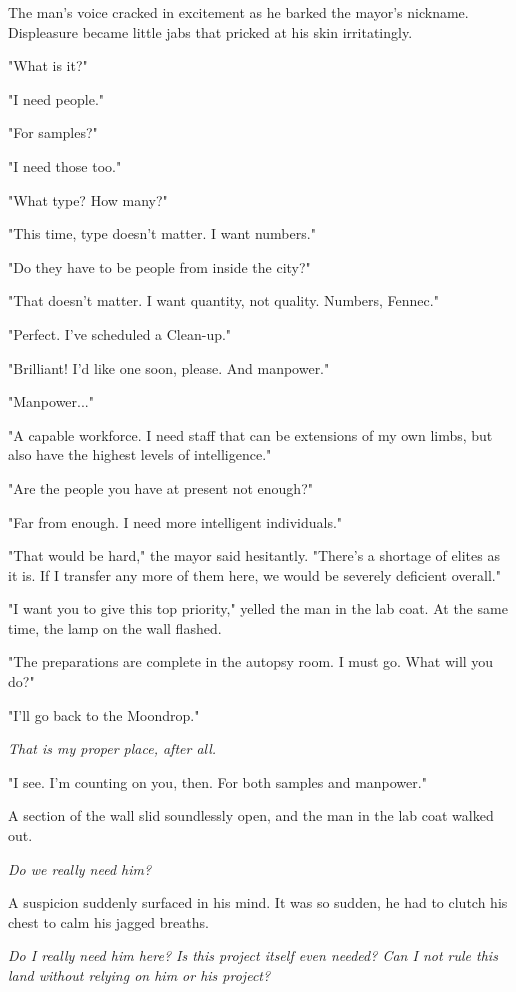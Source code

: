 The man's voice cracked in excitement as he barked the mayor's nickname.
Displeasure became little jabs that pricked at his skin irritatingly.

"What is it?"

"I need people."

"For samples?"

"I need those too."

"What type? How many?"

"This time, type doesn't matter. I want numbers."

"Do they have to be people from inside the city?"

"That doesn't matter. I want quantity, not quality. Numbers, Fennec."

"Perfect. I've scheduled a Clean-up."

"Brilliant! I'd like one soon, please. And manpower."

"Manpower..."

"A capable workforce. I need staff that can be extensions of my own
limbs, but also have the highest levels of intelligence."

"Are the people you have at present not enough?"

"Far from enough. I need more intelligent individuals."

"That would be hard," the mayor said hesitantly. "There's a shortage of
elites as it is. If I transfer any more of them here, we would be
severely deficient overall."

"I want you to give this top priority," yelled the man in the lab coat.
At the same time, the lamp on the wall flashed.

"The preparations are complete in the autopsy room. I must go. What will
you do?"

"I'll go back to the Moondrop."

\emph{That is my proper place, after all.}

"I see. I'm counting on you, then. For both samples and manpower."

A section of the wall slid soundlessly open, and the man in the lab coat
walked out.

\emph{Do we really need him?}

A suspicion suddenly surfaced in his mind. It was so sudden, he had to
clutch his chest to calm his jagged breaths.

\emph{Do I really need him here? Is this project itself even needed? Can I not
rule this land without relying on him or his project?}

